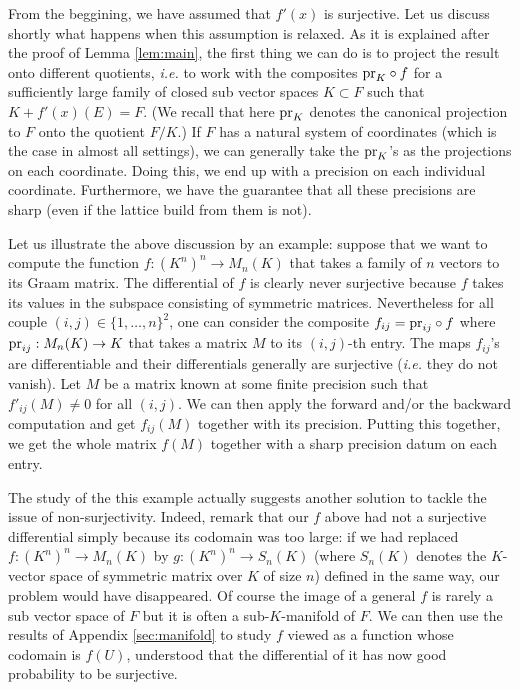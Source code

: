 \documentclass{lms}
\begin{document}
From the beggining, we have assumed that $f'(x)$ is surjective. Let us 
discuss shortly what happens when this assumption is relaxed. As it is 
explained after the proof of Lemma \ref{lem:main}, the first thing we 
can do is to project the result onto different quotients, \emph{i.e.} to 
work with the composites $\text{\rm pr}_K \circ f$ for a sufficiently large family 
of closed sub vector spaces $K \subset F$ such that $K + f'(x)(E) = F$. 
(We recall that here $\text{\rm pr}_K$ denotes the canonical projection to $F$ 
onto the quotient $F/K$.) If $F$ has a natural system of coordinates 
(which is the case in almost all settings), we can generally take the 
$\text{\rm pr}_K$'s as the projections on each coordinate. Doing this, we end up 
with a precision on each individual coordinate. Furthermore, we have the 
guarantee that all these precisions are sharp (even if the lattice build
from them is not).

Let us illustrate the above discussion by an example: suppose that we 
want to compute the function $f : (K^n)^n \to M_n(K)$ that takes a 
family of $n$ vectors to its Graam matrix. The differential of $f$ is
clearly never surjective because $f$ takes its values in the subspace
consisting of symmetric matrices. Nevertheless for all couple $(i,j)
\in \{1, \ldots, n\}^2$, one can consider the composite $f_{ij} = 
\text{\rm pr}_{ij} \circ f$ where $\text{\rm pr}_{ij} : M_n(K) \to K$ that takes a matrix 
$M$ to its $(i,j)$-th entry. The maps $f_{ij}$'s are differentiable and 
their differentials generally are surjective (\emph{i.e.} they do not 
vanish). Let $M$ be a matrix known at some finite precision such that 
$f'_{ij} (M) \neq 0$ for all $(i,j)$. We can then apply the forward 
and/or the backward computation and get $f_{ij}(M)$ together with its 
precision. Putting this together, we get the whole matrix $f(M)$ 
together with a sharp precision datum on each entry.

The study of the this example actually suggests another solution to 
tackle the issue of non-surjectivity. Indeed, remark that our $f$ above 
had not a surjective differential simply because its codomain was too 
large: if we had replaced $f : (K^n)^n \to M_n(K)$ by $g : (K^n)^n \to 
S_n(K)$ (where $S_n(K)$ denotes the $K$-vector space of symmetric matrix 
over $K$ of size $n$) defined in the same way, our problem would have 
disappeared. Of course the image of a general $f$ is rarely a sub vector 
space of $F$ but it is often a sub-$K$-manifold of $F$. We can then use 
the results of Appendix \ref{sec:manifold} to study $f$ viewed as a 
function whose codomain is $f(U)$, understood that the differential of 
it has now good probability to be surjective.
\end{document}
